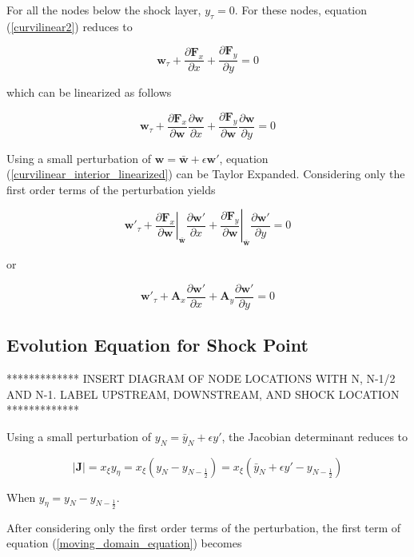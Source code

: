 \documentclass[10pt]{article}
\begin{document}
	For all the nodes below the shock layer, $y_\tau = 0$. For these nodes, equation (\ref{curvilinear2}) reduces to 
	
	$$ \mathbf{w}_\tau  + \frac{\partial \mathbf{F}_x}{\partial x} + \frac{\partial \mathbf{F}_y}{\partial y} = 0 $$
	
	
	which can be linearized as follows
	
	\begin{equation} \label{curvilinear_interior_linearized}
	\mathbf{w}_\tau  + \frac{\partial \mathbf{F}_x}{\partial \mathbf{w}} \frac{\partial \mathbf{w}}{\partial x}+ \frac{\partial \mathbf{F}_y}{\partial \mathbf{w}} \frac{\partial \mathbf{w}}{\partial y} = 0
	\end{equation}

	Using a small perturbation of $\mathbf{w} = \bar{\mathbf{w}} + \epsilon \mathbf{w}'$, equation (\ref{curvilinear_interior_linearized}) can be Taylor Expanded. Considering only the first order terms of the perturbation yields
	
	$$ \mathbf{w}'_\tau  + \left. \frac{\partial \mathbf{F}_x}{\partial \mathbf{w}} \right|_{\bar{\mathbf{w}}} \frac{\partial \mathbf{w}'}{\partial x} + \left. \frac{\partial \mathbf{F}_y}{\partial \mathbf{w}} \right|_{\bar{\mathbf{w}}} \frac{\partial \mathbf{w}'}{\partial y} = 0 $$
	
	or
	
	\begin{equation} \label{curvilinear_interior_expanded}
		\mathbf{w}'_\tau  + \mathbf{A}_x \frac{\partial \mathbf{w}'}{\partial x} + \mathbf{A}_y \frac{\partial \mathbf{w}'}{\partial y} = 0
	\end{equation}
	
	\subsection{Evolution Equation for Shock Point}
	
	************* INSERT DIAGRAM OF NODE LOCATIONS WITH N, N-1/2 AND N-1. LABEL UPSTREAM, DOWNSTREAM, AND SHOCK LOCATION  *************
	
	Using a small perturbation of $y_N = \bar{y}_N + \epsilon y'$, the Jacobian determinant reduces to
	
	$$ |\mathbf{J}| = x_\xi y_\eta = x_\xi (y_N - y_{N-\frac{1}{2}}) = x_\xi (\bar{y}_N + \epsilon y' - y_{N-\frac{1}{2}}) $$
	
	When $y_\eta = y_N - y_{N-\frac{1}{2}}$.
	
	After considering only the first order terms of the perturbation, the first term of equation (\ref{moving_domain_equation}) becomes
	
\end{document}
